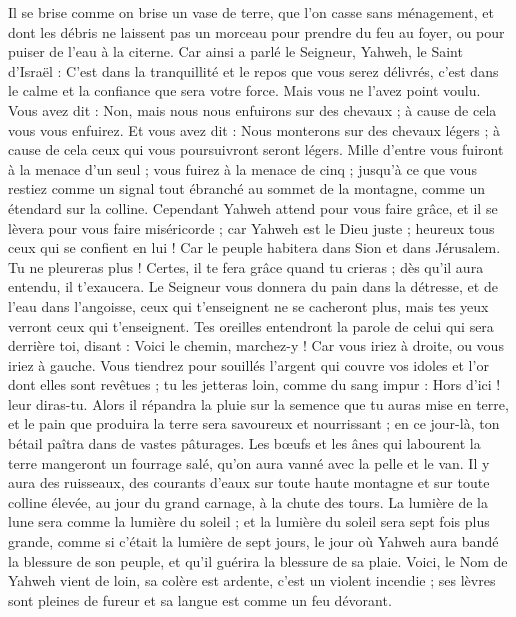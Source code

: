 \begin{multicols}{2}
Il se brise comme on brise un vase de terre, que l'on casse sans ménagement, et dont les débris ne laissent pas un morceau pour prendre du feu au foyer, ou pour puiser de l'eau à la citerne.
Car ainsi a parlé le Seigneur, Yahweh, le Saint d'Israël : C'est dans la tranquillité et le repos que vous serez délivrés, c'est dans le calme et la confiance que sera votre force. Mais vous ne l'avez point voulu.
Vous avez dit : Non, mais nous nous enfuirons sur des chevaux ; à cause de cela vous vous enfuirez. Et vous avez dit : Nous monterons sur des chevaux légers ; à cause de cela ceux qui vous poursuivront seront légers.
Mille d'entre vous fuiront à la menace d'un seul ; vous fuirez à la menace de cinq ; jusqu'à ce que vous restiez comme un signal tout ébranché au sommet de la montagne, comme un étendard sur la colline.
Cependant Yahweh attend pour vous faire grâce, et il se lèvera pour vous faire miséricorde ; car Yahweh est le Dieu juste ; heureux tous ceux qui se confient en lui !
Car le peuple habitera dans Sion et dans Jérusalem. Tu ne pleureras plus ! Certes, il te fera grâce quand tu crieras ; dès qu'il aura entendu, il t'exaucera.
Le Seigneur vous donnera du pain dans la détresse, et de l'eau dans l'angoisse, ceux qui t'enseignent ne se cacheront plus, mais tes yeux verront ceux qui t'enseignent.
Tes oreilles entendront la parole de celui qui sera derrière toi, disant : Voici le chemin, marchez-y ! Car vous iriez à droite, ou vous iriez à gauche.
Vous tiendrez pour souillés l'argent qui couvre vos idoles et l'or dont elles sont revêtues ; tu les jetteras loin, comme du sang impur : Hors d'ici ! leur diras-tu.
Alors il répandra la pluie sur la semence que tu auras mise en terre, et le pain que produira la terre sera savoureux et nourrissant ; en ce jour-là, ton bétail paîtra dans de vastes pâturages.
Les bœufs et les ânes qui labourent la terre mangeront un fourrage salé, qu'on aura vanné avec la pelle et le van.
Il y aura des ruisseaux, des courants d'eaux sur toute haute montagne et sur toute colline élevée, au jour du grand carnage, à la chute des tours.
La lumière de la lune sera comme la lumière du soleil ; et la lumière du soleil sera sept fois plus grande, comme si c'était la lumière de sept jours, le jour où Yahweh aura bandé la blessure de son peuple, et qu'il guérira la blessure de sa plaie.
Voici, le Nom de Yahweh vient de loin, sa colère est ardente, c'est un violent incendie ; ses lèvres sont pleines de fureur et sa langue est comme un feu dévorant.

\end{multicols}
